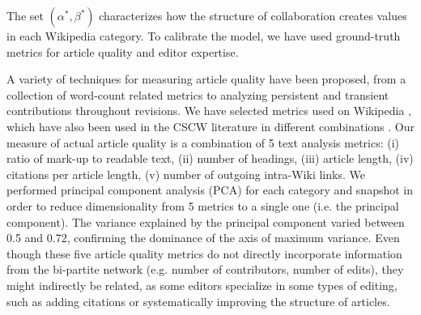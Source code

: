 The set $(\alpha^*,\beta^*)$ characterizes how the structure of collaboration creates values in each Wikipedia category. To calibrate the model, we have used ground-truth metrics for article quality and editor expertise. 

A variety of techniques for measuring article quality have been proposed, from a collection of word-count related metrics \cite{blumenstock2008sizematters} to analyzing persistent and transient contributions throughout revisions\cite{woehner2009}. We have selected metrics used on Wikipedia \cite{wang2013tell,klein}, which have also been used in the CSCW literature in different combinations \cite{kane2011,keegan2012}. Our measure of actual article quality is a combination of 5 text analysis metrics: (i) ratio of mark-up to readable text, (ii) number of headings, (iii) article length, (iv) citations per article length, (v) number of outgoing intra-Wiki links. We performed principal component analysis (PCA) for each category and snapshot in order to reduce dimensionality from 5 metrics to a single one (i.e. the principal component). The variance explained by the principal component varied between 0.5 and 0.72, confirming the dominance of the axis of maximum variance. Even though these five article quality metrics do not directly incorporate information from the bi-partite network (e.g. number of contributors, number of edits), they might indirectly be related, as some editors specialize in some types of editing, such as adding citations or systematically improving the structure of articles.

